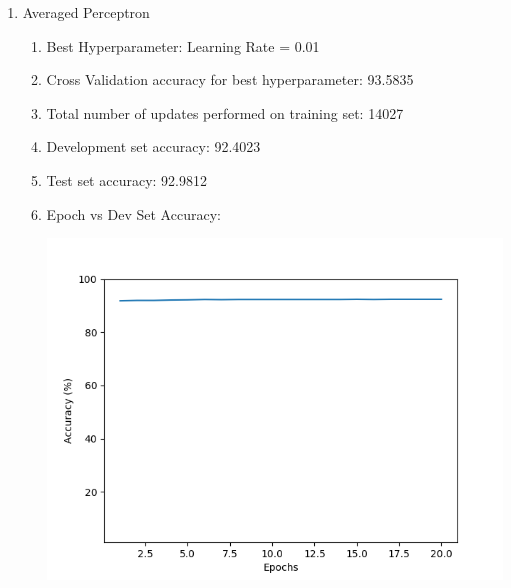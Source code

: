 \begin{enumerate}
\begin{enumerate}
		\item Averaged Perceptron
			\begin{enumerate}
				\item Best Hyperparameter: Learning Rate = 0.01
				\item Cross Validation accuracy for best hyperparameter: 93.5835
				\item Total number of updates performed on training set: 14027
				\item Development set accuracy: 92.4023
				\item Test set accuracy: 92.9812
				\item Epoch vs Dev Set Accuracy:
					\begin{center}
						\includegraphics[scale=0.7]{Averaged}
					\end{center}
			\end{enumerate}


\end{enumerate}
\end{enumerate}
